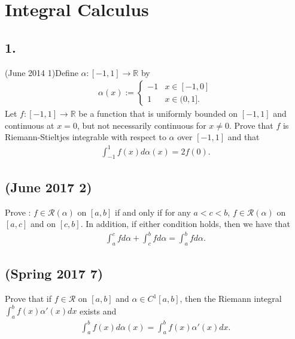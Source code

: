 \hypertarget{integral-calculus-1}{%
\section{Integral Calculus}\label{integral-calculus-1}}

\hypertarget{section-19}{%
\subsection{1.}\label{section-19}}

(June 2014 1)Define \(\alpha \colon [-1,1] \to \mathbb{R}\) by
\begin{align*}\alpha(x) := \begin{cases} -1 & x \in [-1,0] \\ 1 & x \in (0,1]. \end{cases}\end{align*}
Let \(f \colon [-1,1] \to \mathbb{R}\) be a function that is uniformly
bounded on \([-1,1]\) and continuous at \(x=0\), but not necessarily
continuous for \(x \neq 0\). Prove that \(f\) is Riemann-Stieltjes
integrable with respect to \(\alpha\) over \([-1,1]\) and that
\begin{align*}\int_{-1}^1 f(x)d\alpha(x) = 2f(0).\end{align*}

\hypertarget{june-2017-2}{%
\subsection{(June 2017 2)}\label{june-2017-2}}

Prove : \(f \in \mathcal{R}(\alpha)\) on \([a,b]\) if and only if for
any \(a <c<b\), \(f \in \mathcal{R}(\alpha)\) on \([a,c]\) and on
\([c,b]\). In addition, if either condition holds, then we have that
\begin{align*}\int_a^c fd\alpha + \int_c^b fd\alpha = \int_a^b fd\alpha.\end{align*}

\hypertarget{spring-2017-7}{%
\subsection{(Spring 2017 7)}\label{spring-2017-7}}

Prove that if \(f \in \mathcal{R}\) on \([a,b]\) and
\(\alpha \in C^1[a,b]\), then the Riemann integral
\(\int_a^b f(x)\alpha'(x)dx\) exists and
\begin{align*}\int_a^b f(x) d\alpha(x)= \int_a^b f(x)\alpha'(x)dx.\end{align*}


